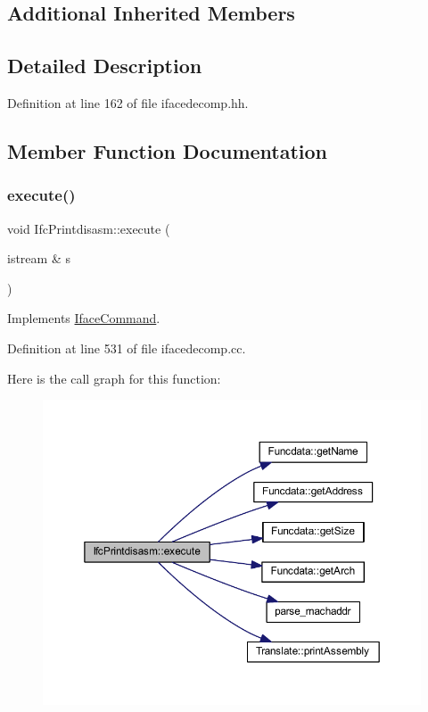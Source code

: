\subsection*{Additional Inherited Members}


\subsection{Detailed Description}


Definition at line 162 of file ifacedecomp.\+hh.



\subsection{Member Function Documentation}
\mbox{\label{class_ifc_printdisasm_aa443ed14bb273335f4c57f80891d9cc3}} 
\subsubsection{\texorpdfstring{execute()}{execute()}}
{\footnotesize\ttfamily void Ifc\+Printdisasm\+::execute (\begin{DoxyParamCaption}\item[{istream \&}]{s }\end{DoxyParamCaption})\hspace{0.3cm}{\ttfamily [virtual]}}



Implements \mbox{\hyperlink{class_iface_command_af10e29cee2c8e419de6efe9e680ad201}{Iface\+Command}}.



Definition at line 531 of file ifacedecomp.\+cc.

Here is the call graph for this function\+:
\nopagebreak
\begin{figure}[H]
\begin{center}
\leavevmode
\includegraphics[width=350pt]{class_ifc_printdisasm_aa443ed14bb273335f4c57f80891d9cc3_cgraph}
\end{center}
\end{figure}


